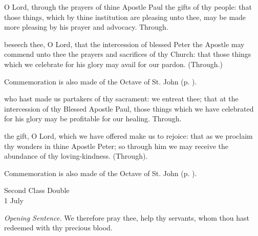 \vspace{-2.5ex}

\secret
{} O Lord, through the prayers of thine Apostle Paul the gifts of thy people: that those things, which by thine institution are pleasing unto thee, may be made more pleasing by his prayer and advocacy. Through.

 beseech thee, O Lord, that the intercession of blessed Peter the Apostle may commend unto thee the prayers and sacrifices of thy Church: that those things which we celebrate for his glory may avail for our pardon. (Through.)

\begin{rubric}
	Commemoration is also made of the Octave of St. John (p. \pageref{JohnSecret}).
\end{rubric}

\vspace{-2.5ex}


\vspace{-1ex}

\postcommunion
{} who hast made us partakers of thy sacrament: we entreat thee; that at the intercession of thy Blessed Apostle Paul, those things which we have celebrated for his glory may be profitable for our healing. Through.

 the gift, O Lord, which we have offered make us to rejoice: that as we proclaim thy wonders in thine Apostle Peter; so through him we may receive the abundance of thy loving-kindness. (Through).

\begin{rubric}
	Commemoration is also made of the Octave of St. John (p. \pageref{JohnPC}).
\end{rubric}


\begin{inhead}
    {Second Class Double\\
1 July}
\end{inhead}
\par\noindent
\textit{Opening Sentence.} We therefore pray thee, help thy servants, whom thou hast redeemed with thy precious blood.

